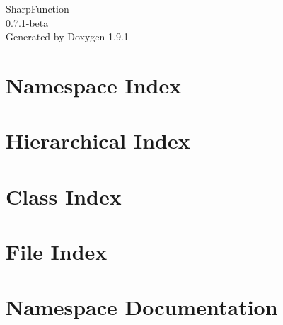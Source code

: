 \let\mypdfximage\pdfximage\def\pdfximage{\immediate\mypdfximage}\documentclass[twoside]{book}
\newcommand{\+}{\discretionary{\mbox{\scriptsize$\hookleftarrow$}}{}{}}
\newcommand{\clearemptydoublepage}{%
  \newpage{\pagestyle{empty}\cleardoublepage}%
}
\begin{document}
\raggedbottom

\hypersetup{pageanchor=false,
             bookmarksnumbered=true,
             pdfencoding=unicode
            }
\begin{titlepage}
\vspace*{7cm}
\begin{center}%
{\Large Sharp\+Function \\[1ex]\large 0.\+7.\+1-\/beta }\\
\vspace*{1cm}
{\large Generated by Doxygen 1.9.1}\\
\end{center}
\end{titlepage}
\clearemptydoublepage
{}
\tableofcontents
\clearemptydoublepage
{}
\hypersetup{pageanchor=true}

\chapter{Namespace Index}

\chapter{Hierarchical Index}

\chapter{Class Index}

\chapter{File Index}

\chapter{Namespace Documentation}










\end{document}
